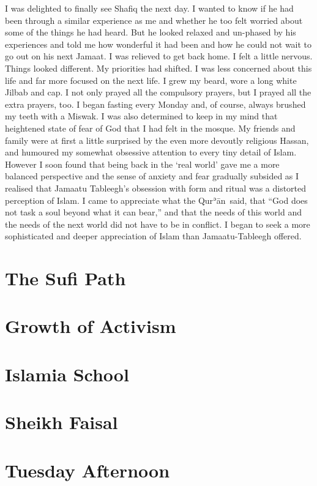 \documentclass[12pt]{memoir}
\def\´{ʾ} %
\newcommand{\cmt}[2]{#1} %
\def \Quran{Qur\-\´ān} %
\def\–{-\hskip0pt}
\begin{document}
I was delighted to finally see Shafiq the next day.
I wanted to know if he had been through a similar experience as me
and whether he too felt worried about some of the things he had heard.
But he looked relaxed and \cmt{un-phased}{unfazed} by his experiences
and told me how wonderful it had been
and how he could not wait to go out on his next Jamaat.
I was relieved to get back home.
I felt a little nervous.
Things looked different.
My priorities had shifted.
I was less concerned about this life and far more focused on the next life.
I grew my beard, wore a long white Jilbab and cap.
I not only prayed all the compulsory prayers,
but I prayed all the extra prayers, too.
I began fasting every Monday and, of course,
always brushed my teeth with a Miswak.
I was also determined to keep in my mind
that heightened state of fear of God that I had felt in the mosque.
My friends and family were at first a little surprised
by the even more devoutly religious Hassan,
and humoured my somewhat obsessive attention to every tiny detail of Islam.
However I soon found that being back in the ‘real world’
gave me a more balanced perspective
and the sense of anxiety and fear gradually subsided
as I realised that Jamaatu Tableegh’s obsession
with form and ritual was a distorted perception of Islam.
I came to appreciate what the \Quran\ said, that
“God does not task a soul beyond what it can bear,”
and that the needs of this world
and the needs of the next world did not have to be in conflict.
I began to seek a more sophisticated and deeper appreciation of Islam than
\cmt{Jamaatu\–Tableegh}{With or w/o '-'? Previously written w/o.} offered.


\chapter{The Sufi Path}
\chapter{Growth of Activism}
\chapter{Islamia School}
\chapter{Sheikh Faisal}
\chapter{Tuesday Afternoon}
\end{document}
